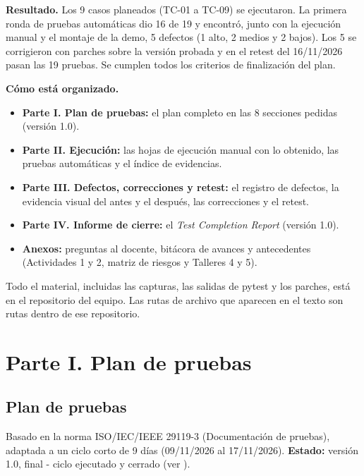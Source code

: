 \documentclass[11pt,a4paper,oneside]{report}
\newcommand{\code}[1]{\leavevmode{\ttfamily\color{tinta}#1}}
\begin{document}
\begin{nota}
\textbf{Resultado.} Los 9 casos planeados (TC-01 a TC-09) se ejecutaron. La primera ronda de pruebas automáticas dio 16 de 19 y encontró, junto con la ejecución manual y el montaje de la demo, 5 defectos (1 alto, 2 medios y 2 bajos). Los 5 se corrigieron con parches sobre la versión probada y en el retest del 16/11/2026 pasan las 19 pruebas. Se cumplen todos los criterios de finalización del plan.
\end{nota}

\textbf{Cómo está organizado.}
\begin{itemize}
\item \textbf{Parte I. Plan de pruebas:} el plan completo en las 8 secciones pedidas (versión 1.0).
\item \textbf{Parte II. Ejecución:} las hojas de ejecución manual con lo obtenido, las pruebas automáticas y el índice de evidencias.
\item \textbf{Parte III. Defectos, correcciones y retest:} el registro de defectos, la evidencia visual del antes y el después, las correcciones y el retest.
\item \textbf{Parte IV. Informe de cierre:} el \emph{Test Completion Report} (versión 1.0).
\item \textbf{Anexos:} preguntas al docente, bitácora de avances y antecedentes (Actividades 1 y 2, matriz de riesgos y Talleres 4 y 5).
\end{itemize}

Todo el material, incluidas las capturas, las salidas de pytest y los parches, está en el repositorio del equipo. Las rutas de archivo que aparecen en el texto son rutas dentro de ese repositorio.


\part*{Parte I. Plan de pruebas}


\chapter*{Plan de pruebas}

\begin{nota}
Basado en la norma ISO/IEC/IEEE \mbox{29119-3} (Documentación de pruebas), adaptada a un ciclo corto de 9 días (09/11/2026 al 17/11/2026). \textbf{Estado:} versión 1.0, final - ciclo ejecutado y cerrado (ver \code{informe-\allowbreak{}de-\allowbreak{}cierre.\allowbreak{}md}).

\end{nota}
\end{document}

